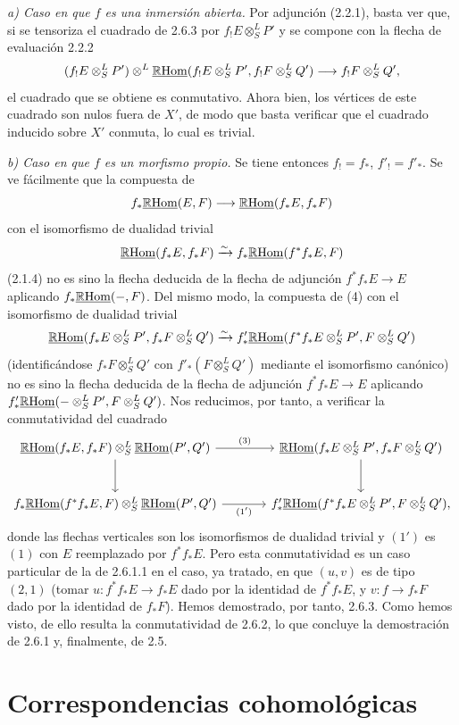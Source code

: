 \emph{a) Caso en que $f$ es una inmersión abierta.} Por adjunción (2.2.1), basta ver que, si se tensoriza el cuadrado de 2.6.3 por $f_!E\otimes^L_SP'$ y se compone con la flecha de evaluación 2.2.2
\[
(f_!E\otimes^L_SP')\otimes^L\underline{\mathbb{R}\mathrm{Hom}}(f_!E\otimes^L_SP',f_!F\otimes^L_SQ')\longrightarrow f_!F\otimes^L_SQ',
\]
el cuadrado que se obtiene es conmutativo. Ahora bien, los vértices de este cuadrado son nulos fuera de $X'$, de modo que basta verificar que el cuadrado inducido sobre $X'$ conmuta, lo cual es trivial.

\emph{b) Caso en que $f$ es un morfismo propio.} Se tiene entonces $f_!=f_*$, $f'_!=f'_*$. Se ve fácilmente que la compuesta de
\[
f_*\underline{\mathbb{R}\mathrm{Hom}}(E,F)\longrightarrow\underline{\mathbb{R}\mathrm{Hom}}(f_*E,f_*F)
\]
con el isomorfismo de dualidad trivial
\[
\underline{\mathbb{R}\mathrm{Hom}}(f_*E,f_*F)\xrightarrow{\sim}f_*\underline{\mathbb{R}\mathrm{Hom}}(f^{*}f_*E,F)
\]
(2.1.4) no es sino la flecha deducida de la flecha de adjunción $f^{*}f_*E\to E$ aplicando $f_*\underline{\mathbb{R}\mathrm{Hom}}(-,F)$. Del mismo modo, la compuesta de (4) con el isomorfismo de dualidad trivial
\[
\underline{\mathbb{R}\mathrm{Hom}}(f_*E\otimes^L_SP',f_*F\otimes^L_SQ')\xrightarrow{\sim}f'_*\underline{\mathbb{R}\mathrm{Hom}}(f^{*}f_*E\otimes^L_SP',F\otimes^L_SQ')
\]
(identificándose $f_*F\otimes^L_SQ'$ con $f'_*(F\otimes^L_SQ')$ mediante el isomorfismo canónico) no es sino la flecha deducida de la flecha de adjunción $f^{*}f_*E\to E$ aplicando $f'_*\underline{\mathbb{R}\mathrm{Hom}}(-\otimes^L_SP',F\otimes^L_SQ')$. Nos reducimos, por tanto, a verificar la conmutatividad del cuadrado
\[
\begin{tikzcd}[column sep=large,row sep=large]
\uRHom(f_*E,f_*F)\otimes^L_S\uRHom(P',Q') \arrow[r,"(3)"] \arrow[d] & \uRHom(f_*E\otimes^L_SP',f_*F\otimes^L_SQ') \arrow[d]\\
f_*\uRHom(f^{*}f_*E,F)\otimes^L_S\uRHom(P',Q') \arrow[r,"(1')"'] & f'_*\uRHom(f^{*}f_*E\otimes^L_SP',F\otimes^L_SQ'),
\end{tikzcd}
\]
donde las flechas verticales son los isomorfismos de dualidad trivial y $(1')$ es $(1)$ con $E$ reemplazado por $f^{*}f_*E$. Pero esta conmutatividad es un caso particular de la de 2.6.1.1 en el caso, ya tratado, en que $(u,v)$ es de tipo $(2,1)$ (tomar $u:f^{*}f_*E\to f_*E$ dado por la identidad de $f^{*}f_*E$, y $v:f\to f_*F$ dado por la identidad de $f_*F$). Hemos demostrado, por tanto, 2.6.3. Como hemos visto, de ello resulta la conmutatividad de 2.6.2, lo que concluye la demostración de 2.6.1 y, finalmente, de 2.5.

\clearpage
\section{Correspondencias cohomológicas}
